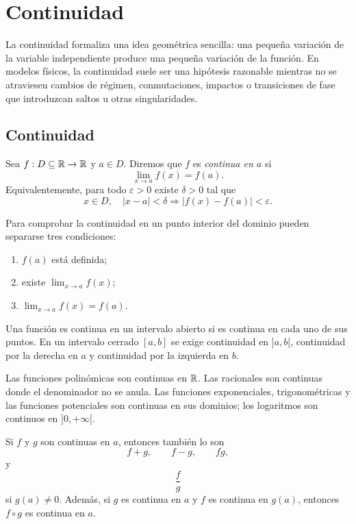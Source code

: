 \section{Continuidad}
\label{sec:continuidad}

La continuidad formaliza una idea geométrica sencilla: una pequeña variación de la variable independiente produce una pequeña variación de la función. En modelos físicos, la continuidad suele ser una hipótesis razonable mientras no se atraviesen cambios de régimen, conmutaciones, impactos o transiciones de fase que introduzcan saltos u otras singularidades.

\subsection{Continuidad}

\begin{definition}[Continuidad]
Sea $f:D\subseteq\mathbb{R}\to\mathbb{R}$ y $a\in D$. Diremos que $f$ es \emph{continua en $a$} si
\[
\lim_{x\to a}f(x)=f(a).
\]
Equivalentemente, para todo $\varepsilon>0$ existe $\delta>0$ tal que
\[
x\in D,\quad |x-a|<\delta
\Longrightarrow
|f(x)-f(a)|<\varepsilon.
\]
\end{definition}

Para comprobar la continuidad en un punto interior del dominio pueden separarse tres condiciones:
\begin{enumerate}
\item $f(a)$ está definida;
\item existe $\displaystyle\lim_{x\to a}f(x)$;
\item $\displaystyle\lim_{x\to a}f(x)=f(a)$.
\end{enumerate}

\begin{definition}
Una función es continua en un intervalo abierto si es continua en cada uno de sus puntos. En un intervalo cerrado $[a,b]$ se exige continuidad en $]a,b[$, continuidad por la derecha en $a$ y continuidad por la izquierda en $b$.
\end{definition}

Las funciones polinómicas son continuas en $\mathbb{R}$. Las racionales son continuas donde el denominador no se anula. Las funciones exponenciales, trigonométricas y las funciones potenciales son continuas en sus dominios; los logaritmos son continuos en $]0,+\infty[$.

\begin{proposition}
Si $f$ y $g$ son continuas en $a$, entonces también lo son
\[
f+g,\qquad f-g,\qquad fg,
\]
y
\[
\frac fg
\]
si $g(a)\neq0$. Además, si $g$ es continua en $a$ y $f$ es continua en $g(a)$, entonces $f\circ g$ es continua en $a$.
\end{proposition}

